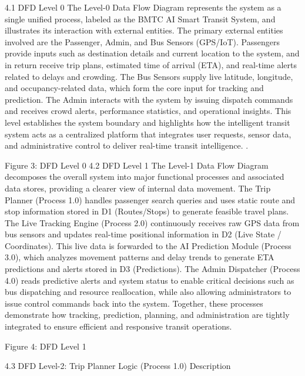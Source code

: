 4.1 DFD Level 0
The Level-0 Data Flow Diagram represents the system as a single unified process, labeled as the BMTC AI Smart Transit System, and illustrates its interaction with external entities. The primary external entities involved are the Passenger, Admin, and Bus Sensors (GPS/IoT). Passengers provide inputs such as destination details and current location to the system, and in return receive trip plans, estimated time of arrival (ETA), and real-time alerts related to delays and crowding. The Bus Sensors supply live latitude, longitude, and occupancy-related data, which form the core input for tracking and prediction. The Admin interacts with the system by issuing dispatch commands and receives crowd alerts, performance statistics, and operational insights. This level establishes the system boundary and highlights how the intelligent transit system acts as a centralized platform that integrates user requests, sensor data, and administrative control to deliver real-time transit intelligence.
.
 
Figure 3: DFD Level 0 
4.2	DFD Level 1
The Level-1 Data Flow Diagram decomposes the overall system into major functional processes and associated data stores, providing a clearer view of internal data movement. The Trip Planner (Process 1.0) handles passenger search queries and uses static route and stop information stored in D1 (Routes/Stops) to generate feasible travel plans. The Live Tracking Engine (Process 2.0) continuously receives raw GPS data from bus sensors and updates real-time positional information in D2 (Live State / Coordinates). This live data is forwarded to the AI Prediction Module (Process 3.0), which analyzes movement patterns and delay trends to generate ETA predictions and alerts stored in D3 (Predictions). The Admin Dispatcher (Process 4.0) reads predictive alerts and system status to enable critical decisions such as bus dispatching and resource reallocation, while also allowing administrators to issue control commands back into the system. Together, these processes demonstrate how tracking, prediction, planning, and administration are tightly integrated to ensure efficient and responsive transit operations.

 
Figure 4: DFD Level 1 

4.3	 DFD Level-2: Trip Planner Logic (Process 1.0) Description

